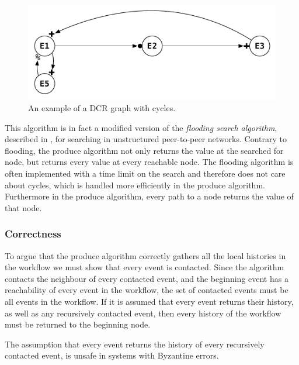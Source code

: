 	\begin{figure}[H]
		\centering
		\includegraphics[height=0.15\textheight]{4connect/images/dcr-graph-cycle.pdf}
		\caption{An example of a DCR graph with cycles.}
		\label{fig:connecting:dcr-graph-cycle}
	\end{figure}
		
	\newpar This algorithm is in fact a modified version of the \textit{flooding search algorithm}, described in \cite{Coulouris:2011:DSC:2029110:chapter6}, for searching in unstructured peer-to-peer networks. Contrary to flooding, the produce algorithm not only returns the value at the searched for node, but returns every value at every reachable node. The flooding algorithm is often implemented with a time limit on the search and therefore does not care about cycles, which is handled more efficiently in the produce algorithm. Furthermore in the produce algorithm, every path to a node returns the value of that node.
	
	\subsubsection{Correctness}
	To argue that the produce algorithm correctly gathers all the local histories in the workflow we must show that every event is contacted. Since the algorithm contacts the neighbour of every contacted event, and the beginning event has a reachability of every event in the workflow, the set of contacted events must be all events in the workflow. If it is assumed that every event returns their history, as well as any recursively contacted event, then every history of the workflow must be returned to the beginning node. 
	
	The assumption that every event returns the history of every recursively contacted event, is unsafe in systems with Byzantine errors.
	
